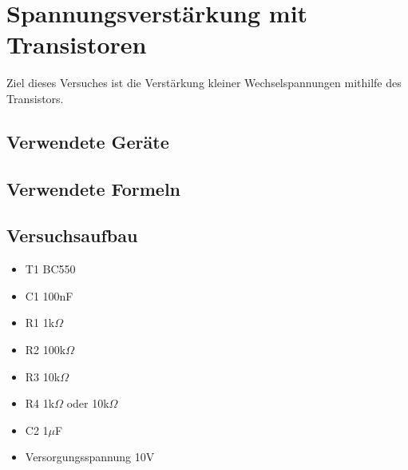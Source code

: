 \documentclass[12pt,a4paper]{article}
\begin{document}
\section{Spannungsverstärkung mit Transistoren}
Ziel dieses Versuches ist die Verstärkung kleiner Wechselspannungen mithilfe des Transistors.
\subsection{Verwendete Geräte}
\subsection{Verwendete Formeln}
\subsection{Versuchsaufbau}

\begin{itemize}
\item	T1 BC550

\item	C1 100nF

\item	R1 1k$\Omega$

\item	R2 100k$\Omega$

\item	R3 10k$\Omega$

\item	R4 1k$\Omega$ oder 10k$\Omega$

\item	C2 1$\mu$F

\item	Versorgungsspannung 10V
\end{itemize}
\end{document}
